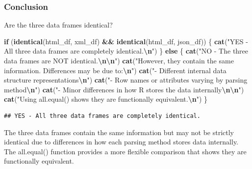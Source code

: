 \documentclass[
]{article}
\newenvironment{Shaded}{\begin{snugshade}}{\end{snugshade}}
\newcommand{\ControlFlowTok}[1]{\textcolor[rgb]{0.13,0.29,0.53}{\textbf{#1}}}
\newcommand{\FunctionTok}[1]{\textcolor[rgb]{0.13,0.29,0.53}{\textbf{#1}}}
\newcommand{\NormalTok}[1]{#1}
\newcommand{\SpecialCharTok}[1]{\textcolor[rgb]{0.81,0.36,0.00}{\textbf{#1}}}
\newcommand{\StringTok}[1]{\textcolor[rgb]{0.31,0.60,0.02}{#1}}
\begin{document}
\subsubsection{Conclusion}\label{conclusion}

Are the three data frames identical?

\begin{Shaded}
\begin{Highlighting}[]
\ControlFlowTok{if}\NormalTok{ (}\FunctionTok{identical}\NormalTok{(html\_df, xml\_df) }\SpecialCharTok{\&\&} \FunctionTok{identical}\NormalTok{(html\_df, json\_df)) \{}
  \FunctionTok{cat}\NormalTok{(}\StringTok{"YES {-} All three data frames are completely identical.}\SpecialCharTok{\textbackslash{}n}\StringTok{"}\NormalTok{)}
\NormalTok{\} }\ControlFlowTok{else}\NormalTok{ \{}
  \FunctionTok{cat}\NormalTok{(}\StringTok{"NO {-} The three data frames are NOT identical.}\SpecialCharTok{\textbackslash{}n\textbackslash{}n}\StringTok{"}\NormalTok{)}
  \FunctionTok{cat}\NormalTok{(}\StringTok{"However, they contain the same information. Differences may be due to:}\SpecialCharTok{\textbackslash{}n}\StringTok{"}\NormalTok{)}
  \FunctionTok{cat}\NormalTok{(}\StringTok{"{-} Different internal data structure representations}\SpecialCharTok{\textbackslash{}n}\StringTok{"}\NormalTok{)}
  \FunctionTok{cat}\NormalTok{(}\StringTok{"{-} Row names or attributes varying by parsing method}\SpecialCharTok{\textbackslash{}n}\StringTok{"}\NormalTok{)}
  \FunctionTok{cat}\NormalTok{(}\StringTok{"{-} Minor differences in how R stores the data internally}\SpecialCharTok{\textbackslash{}n\textbackslash{}n}\StringTok{"}\NormalTok{)}
  \FunctionTok{cat}\NormalTok{(}\StringTok{"Using all.equal() shows they are functionally equivalent.}\SpecialCharTok{\textbackslash{}n}\StringTok{"}\NormalTok{)}
\NormalTok{\}}
\end{Highlighting}
\end{Shaded}

\begin{verbatim}
## YES - All three data frames are completely identical.
\end{verbatim}

The three data frames contain the same information but may not be
strictly identical due to differences in how each parsing method stores
data internally. The all.equal() function provides a more flexible
comparison that shows they are functionally equivalent.
\end{document}

